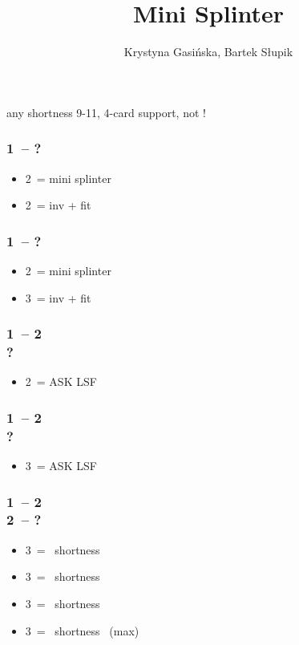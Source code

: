 \documentclass[12pt, a4paper]{article}
\title{Mini Splinter}
\author{Krystyna Gasińska, Bartek Słupik}
\begin{document}
\maketitle


any shortness 9-11, 4-card support, not \gf!

\subsubsection*{1\hearts\ -- ?}
\begin{itemize}
    \item 2\spades\ = mini splinter
    \item 2\nt\ = inv + fit
\end{itemize}

\subsubsection*{1\spades\ -- ?}
\begin{itemize}
    \item 2\nt\ = mini splinter
    \item 3\hearts\ = inv + fit
\end{itemize}

\subsubsection*{1\hearts\ -- 2\spades \\ ?}
\begin{itemize}
    \item 2\nt\ = ASK LSF
\end{itemize}

\subsubsection*{1\spades\ -- 2\nt \\ ?}
\begin{itemize}
    \item 3\clubs\ = ASK LSF
\end{itemize}

\subsubsection*{1\hearts\ -- 2\spades \\ 2\nt\ -- ?}
\begin{itemize}
    \item 3\clubs\ = \clubs\ shortness
    \item 3\diams\ = \diams\ shortness
    \item 3\hearts\ = \spades\ shortness
    \item 3\spades\ = \spades\ shortness \gf\ (max)
\end{itemize}
\end{document}
